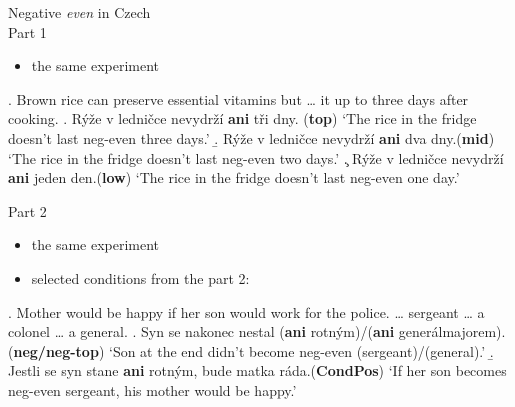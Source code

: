 \documentclass[ignorenonframetext,]{beamer}
\providecommand{\tightlist}{%
  \setlength{\itemsep}{0pt}\setlength{\parskip}{0pt}}
\newcommand{\cond}[1]{\textbf{#1}}
\begin{document}
\begin{frame}{Negative \emph{even} in Czech\\ Part 1}

\begin{itemize}
\tightlist
\item
  the same experiment 
\end{itemize}

\ex. Brown rice can preserve essential vitamins but \ldots{} it up to
three days after cooking.\label{ex-2} \a. Rýže v ledničce nevydrží
\textbf{ani} tři dny. \label{ex-1-a}\hfill (\cond{top})\newline
`The rice in the fridge doesn't last neg-even three days.' \b. Rýže v
ledničce nevydrží \textbf{ani} dva
dny.\label{ex-1-b}\hfill (\cond{mid})\newline
`The rice in the fridge doesn't last neg-even two days.' \c. Rýže v
ledničce nevydrží \textbf{ani} jeden
den.\hfill (\cond{low})\label{ex-1-c}\newline
`The rice in the fridge doesn't last neg-even one day.'

\end{frame}

\begin{frame}{Part 2}

\begin{itemize}
\tightlist
\item
  the same experiment 
\item
  selected conditions from the part 2:
\end{itemize}

\ex. Mother would be happy if her son would work for the police.
\ldots{} sergeant \ldots{} a colonel \ldots{} a general.\label{ex-3} \a.
Syn se nakonec nestal (\textbf{ani} rotným)/(\textbf{ani}
generálmajorem).\hfill (\cond{neg/neg-top}) \label{ex-3-a}\newline
`Son at the end didn't become neg-even (sergeant)/(general).' \b. Jestli
se syn stane \textbf{ani} rotným, bude matka
ráda.\hfill{(\cond{CondPos})}\label{ex-2-b}\newline
`If her son becomes neg-even sergeant, his mother would be happy.'

\end{frame}
\end{document}
